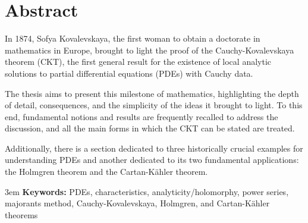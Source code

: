 \chapter*{Abstract}

In 1874, Sofya Kovalevskaya, the first woman to obtain a doctorate in mathematics in Europe, brought to light the proof of the Cauchy-Kovalevskaya theorem (CKT), the first general result for the existence of local analytic solutions to partial differential equations (PDEs) with Cauchy data.

\vspace{6mm}
The thesis aims to present this milestone of mathematics, highlighting the depth of detail, consequences, and the simplicity of the ideas it brought to light. To this end, fundamental notions and results are frequently recalled to address the discussion, and all the main forms in which the CKT can be stated are treated.

\vspace{6mm}
Additionally, there is a section dedicated to three historically crucial examples for understanding PDEs and another dedicated to its two fundamental applications: the Holmgren theorem and the Cartan-Kähler theorem.

\vspace{6mm}
\emergencystretch 3em
\textbf{Keywords:} PDEs, characteristics, analyticity/holomorphy, power series, majorants method, Cauchy-Kovalevskaya, Holmgren, and Cartan-Kähler theorems

\newpage
\blankpage
